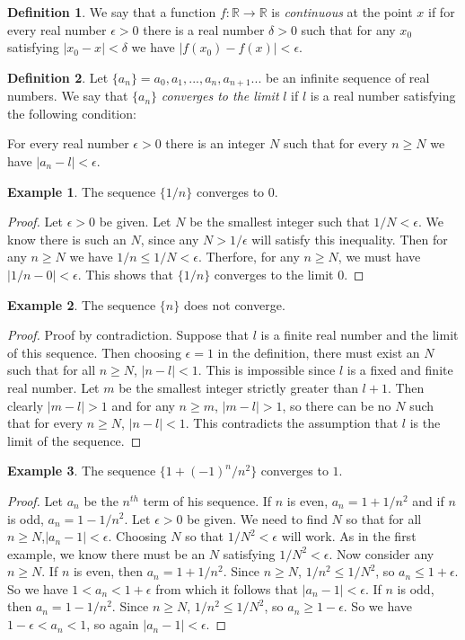 \documentclass[11pt,a4paper]{report}
\theoremstyle{plain}
\theoremstyle{definition}
\newtheorem{defn}{Definition}[section]
\newtheorem{exmp}{Example}[section]
\theoremstyle{remark}
\begin{document}
\begin{defn}
We say that a function $f\colon\mathbb{R}\to\mathbb{R}$ is \textit{continuous} at the point $x$ if for every real number $\epsilon>0$ there is a real number $\delta>0$ such that for any $x_0$ satisfying $|x_0-x|<\delta$ we have $|f(x_0) - f(x)| < \epsilon$.
\end{defn}
\begin{defn}
Let $\{a_n\} = a_0, a_1, ..., a_n, a_{n+1}...$ be an infinite sequence of real numbers.  We say that $\{a_n\}$ \textit{converges to the limit} $l$ if $l$ is a real number satisfying the following condition:
\begin{adjustwidth}{.5cm}{}
For every real number $\epsilon>0$ there is an integer $N$ such that for every $n \geq N$ we have $|a_n - l| < \epsilon$.
\end{adjustwidth}
\end{defn}
\begin{exmp}
The sequence $\{1/n\}$ converges to 0.
\begin{proof}
Let $\epsilon>0$ be given. Let $N$ be the smallest integer such that $1/N < \epsilon$.  We know there is such an $N$, since any $N > 1/ \epsilon$ will satisfy this inequality. Then for any $n \geq N$ we have $1/n \leq 1/N < \epsilon$.  Therfore, for any $n \geq N$, we must have $|1/n - 0| < \epsilon$.  This shows that $\{1/n\}$ converges to the limit $0$.
\end{proof}
\end{exmp}
\begin{exmp}
The sequence $\{n\}$ does not converge.
\begin{proof}
Proof by contradiction.  Suppose that $l$ is a finite real number and the limit of this sequence. Then choosing $\epsilon = 1$ in the definition, there must exist an $N$ such that for all $n \geq N$, $|n - l| < 1$. This is impossible since $l$ is a fixed and finite real number.  Let $m$ be the smallest integer strictly greater than $l + 1$.  Then clearly $|m - l| > 1$ and for any $n \geq m$, $|m - l| > 1$, so there can be no $N$ such that for every $n \geq N$, $|n - l| < 1$. This contradicts the assumption that $l$ is the limit of the sequence.
\end{proof}
\end{exmp}
\begin{exmp}
The sequence $\{1 + (-1)^n/n^2\}$ converges to $1$.
\begin{proof}
Let $a_n$ be the $n^{th}$ term of his sequence.  If $n$ is even, $a_n = 1 + 1/n^2$ and if $n$ is odd, $a_n = 1 - 1/n^2$.  Let $\epsilon > 0$ be given.  We need to find $N$ so that for all $n \geq N$,$|a_n - 1| < \epsilon$.  Choosing $N$ so that $1/N^2 < \epsilon$ will work.  As in the first example, we know there must be an $N$ satisfying $1/N^2 < \epsilon$.  Now consider any $n \geq N$.  If $n$ is even, then $a_n = 1 + 1/n^2$.  Since $n \geq N$, $1/n^2 \leq 1/N^2$, so $a_n \leq 1 + \epsilon$.  So we have $1 < a_n < 1 + \epsilon$ from which it follows that $|a_n - 1| < \epsilon$.  If $n$ is odd, then $a_n = 1 - 1/n^2$. Since $n \geq N$, $1/n^2 \leq 1/N^2$, so $a_n \geq 1 - \epsilon$.  So we have $1 - \epsilon < a_n < 1$, so again $|a_n - 1| < \epsilon$.
\end{proof}
\end{exmp}
\end{document}
